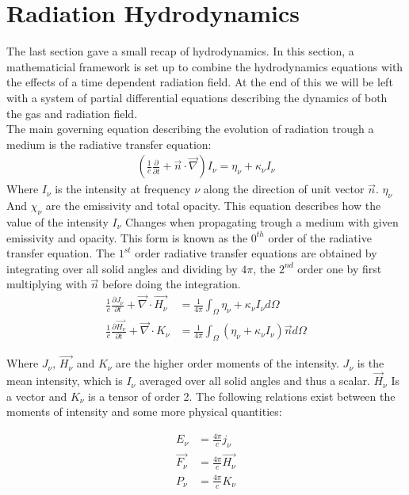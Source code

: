 \section{Radiation Hydrodynamics}
The last section gave a small recap of hydrodynamics. In this section, a mathematicial framework is set up to combine the hydrodynamics equations with the effects of a time dependent radiation field. At the end of this we will be left with a system of partial differential equations describing the dynamics of both the gas and radiation field.\\ 
The main governing equation describing the evolution of radiation trough a medium is the radiative transfer equation:
\begin{align}
\left( \frac{1}{c} \frac{\partial}{\partial t} + \vec{n} \cdot \vec{\nabla} \right) I_\nu = \eta_\nu + \kappa_\nu I_\nu
\end{align}
Where $I_\nu$ is the intensity at frequency $\nu$ along the direction of unit vector $\vec{n}$. $\eta_\nu$ And $\chi_\nu$ are the emissivity and total opacity. This equation describes how the value of the intensity $I_\nu$ Changes when propagating trough a medium with given emissivity and opacity. This form is known as the $0^{th}$ order of the radiative transfer equation. The $1^{st}$  order radiative transfer equations are obtained by integrating over all solid angles and dividing by $4 \pi$, the $2^{nd}$ order one by first multiplying with $\vec{n}$ before doing the integration.\\

\begin{align}
\frac{1}{c} \frac{\partial J_\nu}{\partial t} + \vec{\nabla} \cdot \vec{H_\nu} &= \frac{1}{4 \pi} \int_\Omega \eta_\nu + \kappa_\nu I_\nu d\Omega \\
\frac{1}{c} \frac{\partial \vec{H_\nu}}{\partial t} + \vec{\nabla} \cdot K_\nu &= \frac{1}{4 \pi} \int_\Omega \left( \eta_\nu + \kappa_\nu I_\nu\right) \vec{n} d\Omega
\end{align}

Where $J_\nu$, $\vec{H_\nu}$ and $K_\nu$ are the higher order moments of the intensity. $J_\nu$ is the mean intensity, which is $I_\nu$ averaged over all solid angles and thus a scalar. $\vec{H}_\nu$ Is a vector and $K_\nu$ is a tensor of order 2. The following relations exist between the moments of intensity and some more physical quantities:

\begin{align}
E_\nu &= \frac{4 \pi}{c} j_\nu \\
\vec{F_\nu} &= \frac{4 \pi}{c} \vec{H_\nu} \\
P_\nu &= \frac{4 \pi}{c} K_\nu
\end{align}

